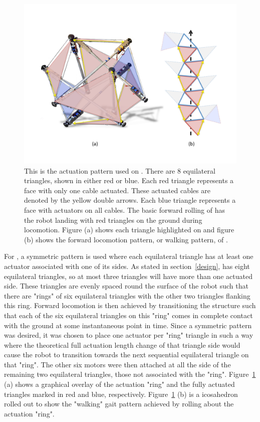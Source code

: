 \begin{figure}[thbp]
    \vspace{-0.5in}
    \centering
    \includegraphics[width=0.8\linewidth]{tex/img/SB_RedvBlue_with_Walk}
    \vspace{-0.4in}
    \caption{
    This is the actuation pattern used on \SB{}. There are 8 equilateral triangles, shown in either red or blue.
    Each red triangle represents a face with only one cable actuated. 
    These actuated cables are denoted by the yellow double arrows. 
    Each blue triangle represents a face with actuators on all cables. 
    The basic forward rolling of \SB{} has the robot landing with red triangles on the ground during locomotion. 
    Figure (a) shows each triangle highlighted on \SB{} and figure (b) shows the forward locomotion pattern, or walking pattern, of \SB{}.
    }
    \label{fig:actuator_pattern}
    \vspace{-0.1in}
\end{figure}

For \SB{}, a symmetric pattern is used where each equilateral triangle has at least one actuator associated with one of its sides.
As stated in section~\ref{design}, \SB{} has eight equilateral triangles, so at most three triangles will have more than one actuated side.
These triangles are evenly spaced round the surface of the robot such that there are "rings" of six equilateral triangles with the other two triangles flanking this ring.
Forward locomotion is then achieved by transitioning the structure such that each of the six equilateral triangles on this "ring" comes in complete contact with the ground at some instantaneous point in time.
Since a symmetric pattern was desired, it was chosen to place one actuator per "ring" triangle in such a way where the theoretical full actuation length change of that triangle side would cause the robot to transition towards the next sequential equilateral triangle on that "ring".
The other six motors were then attached at all the side of the remaining two equilateral triangles, those not associated with the "ring".
Figure~\ref{fig:actuator_pattern} (a) shows a graphical overlay of the actuation "ring" and the fully actuated triangles marked in red and blue, respectively.
Figure~\ref{fig:actuator_pattern} (b) is a icosahedron rolled out to show the "walking" gait pattern achieved by rolling about the actuation "ring".

